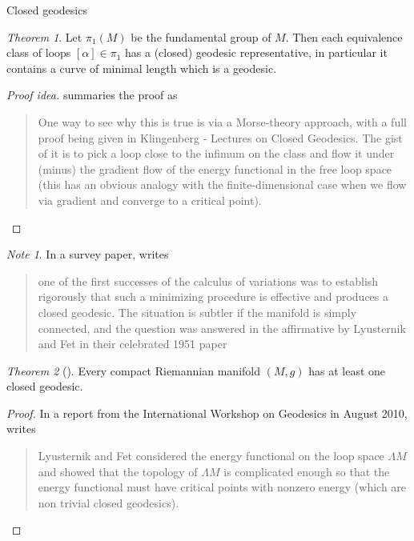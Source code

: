\documentclass{article}
\theoremstyle{definition}
\theoremstyle{remark}
\newtheorem{remark}{Note}[section]
\newtheorem{theorem}{Theorem}[section]
\begin{document}
\begin{section}{Closed geodesics}

  \begin{theorem}
    Let $\pi_1(M)$ be the fundamental group of $M$. Then each equivalence class
    of loops $[\alpha] \in \pi_1$ has a (closed) geodesic representative, in
    particular it contains a curve of minimal length which is a geodesic.
  \end{theorem}
  \begin{proof}[Proof idea]
    \cite{Macedo} summaries the proof as \begin{quote}
      One way to see why this is true is via a Morse-theory approach, with a
      full proof being given in Klingenberg - Lectures on Closed Geodesics. The
      gist of it is to pick a loop close to the infimum on the class and flow it
      under (minus) the gradient flow of the energy functional in the free loop
      space (this has an obvious analogy with the finite-dimensional case when
      we flow via gradient and converge to a critical point).
    \end{quote}
  \end{proof}

  \begin{remark}
  In a survey paper, \cite{Oancea} writes
    \begin{quote}
      one of the first successes of the calculus of variations was to establish
      rigorously that such a minimizing procedure is effective and produces a
      closed geodesic. The situation is subtler if the manifold is simply
      connected, and the question was answered in the affirmative by Lyusternik
      and Fet in their celebrated 1951 paper
    \end{quote}
  \end{remark}

  \begin{theorem}[\cite{Lyusternik}]
    Every compact Riemannian manifold $(M, g)$ has at least one closed geodesic.
  \end{theorem}
  \begin{proof}
    In a report from the International Workshop on Geodesics in August 2010,
    \cite{Burns} writes \begin{quote}
      Lyusternik and Fet considered the energy functional on the loop space $\Lambda M$ and
      showed that the topology of $\Lambda M$ is complicated enough so that the
      energy functional must have critical points with nonzero energy (which are
      non trivial closed geodesics).
    \end{quote}
  \end{proof}


\end{section}
\end{document}
